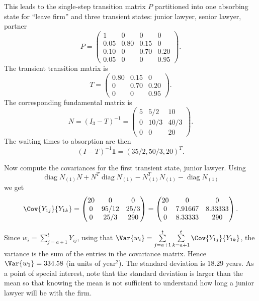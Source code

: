 \documentclass[12pt]{article}
\begin{document}
\begin{example}
This leads to the single-step transition matrix \( P \) partitioned into
one absorbing state for ``leave firm'' and three transient
states: junior lawyer, senior lawyer, partner
\[
    P =
    \begin{pmatrix}
        1    & 0    & 0    & 0    \\
        0.05 & 0.80 & 0.15 & 0    \\
        0.10 & 0    & 0.70 & 0.20 \\
        0.05 & 0    & 0    & 0.95
    \end{pmatrix}.
\] The transient transition matrix is
\[
    T = 
    \begin{pmatrix}
         0.80 & 0.15 & 0 \\
               0 & 0.70 & 0.20 \\
               0 &    0 & 0.95
    \end{pmatrix}.
\] The corresponding fundamental matrix is
\[
    N= (I_3 - T)^{-1} =
    \begin{pmatrix}
        5 & 5/2 & 10 \\
        0 & 10/3 & 40/3 \\
        0 & 0 & 20
    \end{pmatrix}.
\] The waiting times to absorption are then
\[
    (I-T)^{-1} \mathbf{1} = (35/2, 50/3, 20)^{T}.
\]

Now compute the covariances for the first transient state, junior
lawyer.  Using
\[
    \operatorname{diag}
    {N_{(1)}} N + N^T
    \operatorname{diag}
    {N_{(1)}} - N_{(1)}^T N_{(1)} -
    \operatorname{diag}
    N_{(1)}
\] we get
\[
    \Cov{Y_{1j}}{Y_{1k}} =
    \begin{pmatrix}
        20 & 0 & 0 \\
        0 & 95/12 & 25/3 \\
        0 & 25/3 & 290
    \end{pmatrix}
    =
    \begin{pmatrix}
        20 & 0 & 0 \\
        0 & 7.91667 & 8.33333 \\
        0 & 8.33333 & 290
    \end{pmatrix}.
\]

Since \( w_i = \sum\limits_{j=a+1}^{t} Y_{ij} \), using that \( \Var{w_i}
= \sum\limits_{j=a+1}^t \sum\limits_{k=a+1}^t \Cov{Y_{1j}}{Y_{1k}} \),
the variance is the sum of the entries in the covariance matrix. Hence \(
\Var{w_1} = 334.58 \) (in units of \( \text{year}^2 \)).  The standard
deviation is \( 18.29 \) years.  As a point of special interest, note that the
standard deviation is larger than the mean so that knowing the mean is
not sufficient to understand how long a junior lawyer will be with the firm.
\end{example}
\end{document}
